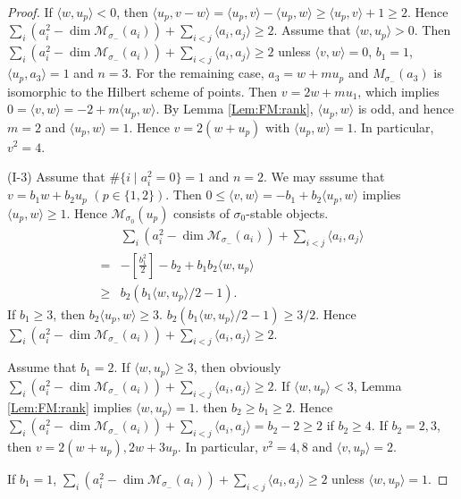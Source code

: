 \documentclass[leqno,11pt]{amsart}
\def\dim{\mathop{\mathrm{dim}}\nolimits}
\theoremstyle{definition}
\def\MM{\ensuremath{\mathcal M}}
\begin{document}
\begin{proof}
If $\langle w,u_p \rangle<0$, then
$\langle u_p,v-w \rangle=\langle u_p,v \rangle-\langle u_p,w \rangle
\geq \langle u_p,v \rangle+1 \geq 2$.
Hence
$\sum_i(a_i^2-\dim \MM_{\sigma_-}(a_i))+\sum_{i<j}\langle a_i,a_j \rangle 
\geq 2$.
Assume that $\langle w,u_p \rangle >0$.
Then $\sum_i(a_i^2-\dim \MM_{\sigma_-}(a_i))+\sum_{i<j}\langle a_i,a_j \rangle
\geq 2$ unless $\langle v,w \rangle=0$,
$b_1=1$, 
$\langle u_p,a_3 \rangle=1$ and $n=3$.
For the remaining case, $a_3=w+m u_p$ and
$M_{\sigma_-}(a_3)$ is isomorphic to the Hilbert scheme of points.
Then $v=2w+m u_1$, which implies 
$0=\langle v,w \rangle=-2+m \langle u_p,w \rangle$.
By Lemma \ref{Lem:FM:rank}, $\langle u_p,w \rangle$ is odd, and hence
$m=2$ and $\langle u_p,w \rangle=1$.
Hence $v=2(w+u_p)$ with $\langle u_p,w \rangle=1$.
In particular, $v^2=4$.

(I-3)
Assume that $\#\{i \mid a_i^2=0 \}=1$ and $n =2$.
We may sssume that $v=b_1 w+b_2 u_p$ $(p \in \{1,2\})$.
Then $0 \leq \langle v,w \rangle=-b_1+b_2 \langle u_p,w \rangle$
implies $\langle u_p,w \rangle \geq 1$. 
Hence $\MM_{\sigma_0}(u_p)$ consists of $\sigma_0$-stable
objects.
\begin{equation}
\begin{split}
&\sum_i(a_i^2-\dim \MM_{\sigma_-}(a_i))+\sum_{i<j}\langle a_i,a_j \rangle \\
=&-[\tfrac{b_1^2}{2}]-b_2+b_1 b_2 \langle w,u_p \rangle\\
\geq & b_2(b_1 \langle w,u_p \rangle/2-1).
\end{split}
\end{equation}
If $b_1 \geq 3$, then $b_2 \langle u_p, w \rangle \geq 3$.
$b_2(b_1 \langle w,u_p \rangle/2-1) \geq 3/2$.
Hence 
$\sum_i(a_i^2-\dim \MM_{\sigma_-}(a_i))+\sum_{i<j}\langle a_i,a_j \rangle
\geq 2$.

Assume that $b_1=2$.
If $\langle w,u_p \rangle \geq 3$, then
obviously
 $\sum_i(a_i^2-\dim \MM_{\sigma_-}(a_i))+\sum_{i<j}\langle a_i,a_j \rangle
\geq 2$.
If $\langle w,u_p \rangle <3$, Lemma \ref{Lem:FM:rank} implies
$\langle w,u_p \rangle=1$.
then
$b_2 \geq b_1 \geq 2$.
Hence 
 $\sum_i(a_i^2-\dim \MM_{\sigma_-}(a_i))+\sum_{i<j}\langle a_i,a_j \rangle
=b_2-2 \geq 2$ if $b_2 \geq 4$.
If $b_2=2,3$, then
$v=2(w+u_p), 2w+3 u_p$.
In particular, $v^2=4,8$ and $\langle v,u_p \rangle=2$.
 
If $b_1=1$, 
$\sum_i(a_i^2-\dim \MM_{\sigma_-}(a_i))+\sum_{i<j}\langle a_i,a_j \rangle
\geq 2$ unless $\langle w,u_p \rangle=1$.











\end{proof}
\end{document}

